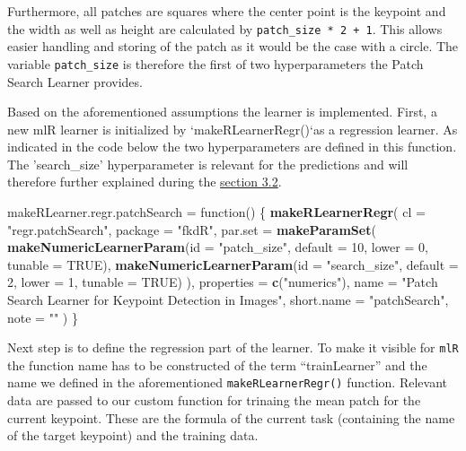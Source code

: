 \documentclass[]{article}
\newenvironment{Shaded}{\begin{snugshade}}{\end{snugshade}}
\newcommand{\KeywordTok}[1]{\textcolor[rgb]{0.13,0.29,0.53}{\textbf{{#1}}}}
\newcommand{\DataTypeTok}[1]{\textcolor[rgb]{0.13,0.29,0.53}{{#1}}}
\newcommand{\DecValTok}[1]{\textcolor[rgb]{0.00,0.00,0.81}{{#1}}}
\newcommand{\StringTok}[1]{\textcolor[rgb]{0.31,0.60,0.02}{{#1}}}
\newcommand{\OtherTok}[1]{\textcolor[rgb]{0.56,0.35,0.01}{{#1}}}
\newcommand{\NormalTok}[1]{{#1}}
\begin{document}
Furthermore, all patches are squares where the center point is the
keypoint and the width as well as height are calculated by
\texttt{patch\_size\ *\ 2\ +\ 1}. This allows easier handling and
storing of the patch as it would be the case with a circle. The variable
\texttt{patch\_size} is therefore the first of two hyperparameters the
Patch Search Learner provides.

Based on the aforementioned assumptions the learner is implemented.
First, a new mlR learner is initialized by `makeRLearnerRegr()`as a
regression learner. As indicated in the code below the two
hyperparameters are defined in this function. The 'search\_size'
hyperparameter is relevant for the predictions and will therefore
further explained during the
\protect\hyperlink{patch-search-pred}{section 3.2}.

\begin{Shaded}
\begin{Highlighting}[]
\NormalTok{makeRLearner.regr.patchSearch =}\StringTok{ }\NormalTok{function() \{}
  \KeywordTok{makeRLearnerRegr}\NormalTok{(}
    \DataTypeTok{cl =} \StringTok{"regr.patchSearch"}\NormalTok{,}
    \DataTypeTok{package =} \StringTok{"fkdR"}\NormalTok{,}
    \DataTypeTok{par.set =} \KeywordTok{makeParamSet}\NormalTok{(}
      \KeywordTok{makeNumericLearnerParam}\NormalTok{(}\DataTypeTok{id =} \StringTok{"patch_size"}\NormalTok{, }\DataTypeTok{default =} \DecValTok{10}\NormalTok{, }\DataTypeTok{lower =} \DecValTok{0}\NormalTok{, }\DataTypeTok{tunable =} \OtherTok{TRUE}\NormalTok{),}
      \KeywordTok{makeNumericLearnerParam}\NormalTok{(}\DataTypeTok{id =} \StringTok{"search_size"}\NormalTok{, }\DataTypeTok{default =} \DecValTok{2}\NormalTok{, }\DataTypeTok{lower =} \DecValTok{1}\NormalTok{, }\DataTypeTok{tunable =} \OtherTok{TRUE}\NormalTok{)}
    \NormalTok{),}
    \DataTypeTok{properties =} \KeywordTok{c}\NormalTok{(}\StringTok{"numerics"}\NormalTok{),}
    \DataTypeTok{name =} \StringTok{"Patch Search Learner for Keypoint Detection in Images"}\NormalTok{,}
    \DataTypeTok{short.name =} \StringTok{"patchSearch"}\NormalTok{,}
    \DataTypeTok{note =} \StringTok{""}
  \NormalTok{)}
\NormalTok{\}}
\end{Highlighting}
\end{Shaded}

Next step is to define the regression part of the learner. To make it
visible for \texttt{mlR} the function name has to be constructed of the
term ``trainLearner'' and the name we defined in the aforementioned
\texttt{makeRLearnerRegr()} function. Relevant data are passed to our
custom function for trinaing the mean patch for the current keypoint.
These are the formula of the current task (containing the name of the
target keypoint) and the training data.
\end{document}
